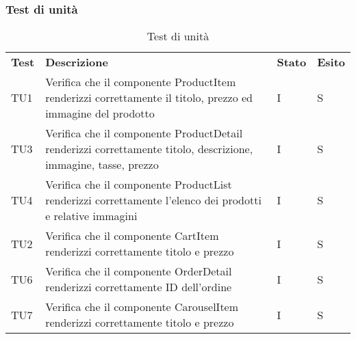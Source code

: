 \subsubsection{Test di unità}
\begin{center}
    \centering
    \renewcommand{\arraystretch}{1.8}
    \label{tab:TestUnita}
    \begin{longtable}[!h]{p{45px} p{255px} p{35px} p{35px}}
        \caption{Test di unità}                                                                                                                                                                                                                            \\
        \rowcolor{logo!70}
        \textbf{Test} & \textbf{Descrizione}                                                                                                                                                                             & \textbf{Stato} & \textbf{Esito} \\
        TU1           & Verifica che il componente ProductItem renderizzi correttamente il titolo, prezzo ed immagine del prodotto                                                                                       & I              & S              \\
        TU3           & Verifica che il componente ProductDetail renderizzi correttamente titolo, descrizione, immagine, tasse, prezzo                                                                                   & I              & S              \\
        TU4           & Verifica che il componente ProductList renderizzi correttamente l'elenco dei prodotti e relative immagini                                                                                        & I              & S              \\
        TU2           & Verifica che il componente CartItem renderizzi correttamente titolo e prezzo                                                                                                                     & I              & S              \\
        TU6           & Verifica che il componente OrderDetail renderizzi correttamente ID dell'ordine                                                                                                                   & I              & S              \\
        TU7           & Verifica che il componente CarouselItem renderizzi correttamente titolo e prezzo                                                                                                                 & I              & S              \\

\end{longtable}
\end{center}
